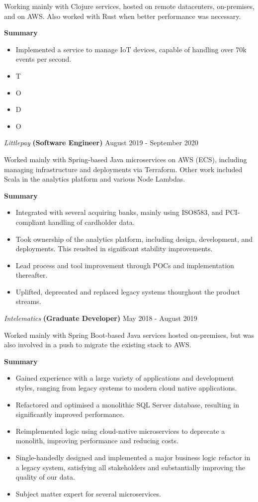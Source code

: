 \documentclass[margin, 11pt]{style}
\begin{document}
\begin{resume}
Working mainly with Clojure services, hosted on remote datacenters, on-premises, and on AWS. Also worked with Rust when better performance was necessary.

\textbf{Summary}

\begin{itemize}
\item Implemented a service to manage IoT devices, capable of handling over 70k events per second.
\item T
\item O
\item D
\item O
\end{itemize}

\pagebreak

{\sl Littlepay} \textbf{(Software Engineer)} \hfill August 2019 - September 2020

Worked mainly with Spring-based Java microservices on AWS (ECS), including managing infrastructure and deployments via Terraform. Other work included Scala in the analytics platform and various Node Lambdas.

\textbf{Summary}

\begin{itemize}
\item Integrated with several acquiring banks, mainly using ISO8583, and PCI-compliant handling of cardholder data.
\item Took ownership of the analytics platform, including design, development, and deployments. This reuslted in significant stability improvements.
\item Lead process and tool improvement through POCs and implementation thereafter.
\item Uplifted, deprecated and replaced legacy systems thourghout the product streams.
\end{itemize}

\vspace{15pt}
{\sl Intelematics} \textbf{(Graduate Developer)} \hfill May 2018 - August 2019

Worked mainly with Spring Boot-based Java services hosted on-premises, but was also involved in a push to migrate the existing stack to AWS.

\textbf{Summary}
\begin{itemize}
\item Gained experience with a large variety of applications and development styles, ranging from legacy systems to modern cloud native applications.
\item Refactored and optimised a monolithic SQL Server database, resulting in significantly improved performance.
\item Reimplemented logic using cloud-native microservices to deprecate a monolith, improving performance and reducing costs.
\item Single-handedly designed and implemented a major business logic refactor in a legacy system, satisfying all stakeholders and substantially improving the quality of our data.
\item Subject matter expert for several microservices.
\end{itemize}


\end{resume}
\end{document}
